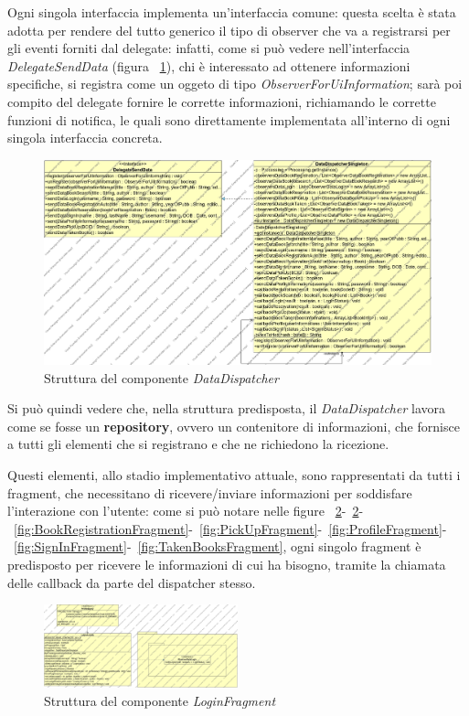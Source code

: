 Ogni singola interfaccia implementa un'interfaccia comune: questa scelta è stata adotta per rendere del tutto generico il tipo di observer che va a registrarsi per gli eventi forniti dal delegate: infatti, come si può vedere nell'interfaccia \textit{DelegateSendData} (figura ~\ref{fig:DataDispatcher}), chi è interessato ad ottenere informazioni specifiche, si registra come un oggeto di tipo \textit{ObserverForUiInformation}; sarà poi compito del delegate fornire le corrette informazioni, richiamando le corrette funzioni di notifica, le quali sono direttamente implementata all'interno di ogni singola interfaccia concreta.

\begin{figure}[h!]
	\includegraphics[width=\textwidth]{Immagini/ClassDiagramDispatcherDelegate}
	\caption{Struttura del componente \textit{DataDispatcher}}
	\label{fig:DataDispatcher}
\end{figure}

Si può quindi vedere che, nella struttura predisposta, il \textit{DataDispatcher} lavora come se fosse un \textbf{repository}, ovvero un contenitore di informazioni, che fornisce a tutti gli elementi che si registrano e che ne richiedono la ricezione.

Questi elementi, allo stadio implementativo attuale, sono rappresentati da tutti i fragment, che necessitano di ricevere/inviare informazioni per soddisfare l'interazione con l'utente: come si può notare nelle figure ~\ref{fig:LoginFragment}-~\ref{fig:LoginFragment}-~\ref{fig:BookRegistrationFragment}-~\ref{fig:PickUpFragment}-~\ref{fig:ProfileFragment}-~\ref{fig:SignInFragment}-~\ref{fig:TakenBooksFragment}, ogni singolo fragment è predisposto per ricevere le informazioni di cui ha bisogno, tramite la chiamata delle callback da parte del dispatcher stesso.


\begin{figure}[h!]
	\includegraphics[width=0.5\textwidth]{Immagini/LoginFragment}
	\caption{Struttura del componente \textit{LoginFragment}}
	\label{fig:LoginFragment}
\end{figure}



